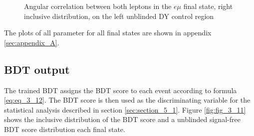 \begin{figure}[htp]
	\caption[Angular correlation between both leptons]{Angular correlation between both leptons in the $e\mu$ final state, right inclusive distribution, on the left unblinded \gls{DY} control region}
	\label{fig:DPHI}
\end{figure}


The plots of all parameter for all final states are shown in appendix \ref{sec:appendix_A}. \\



\subsection{BDT output}
\label{sec:section_3_5_3}

The trained \gls{BDT} assigns the \gls{BDT} score to each event according to formula \ref{eq:eq_3_12}. The \gls{BDT} score is then used as the discriminating variable for the statistical analysis described in section \ref{sec:section_5_1}. Figure \ref{fig:fig_3_11} shows the inclusive distribution of the \gls{BDT} score and a unblinded signal-free \gls{BDT} score distribution each final state. \\

